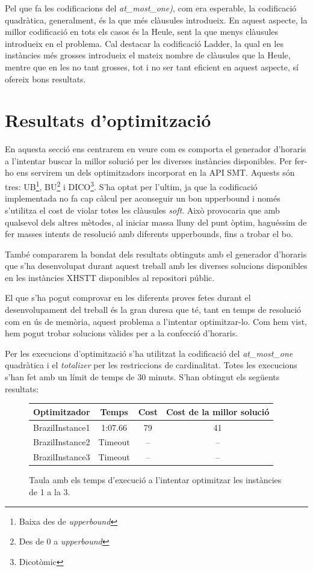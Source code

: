 \documentclass[11pt,a4paper,twoside]{report}
\begin{document}
  Pel que fa les codificacions del \textit{at\_most\_one)}, com era esperable, la codificació quadràtica, generalment, és la que més clàusules introdueix. 
  En aquest aspecte, la millor codificació en tots els casos és la Heule, sent la que menys clàusules introdueix en el problema. Cal destacar la codificació Ladder, 
  la qual en les instàncies més grosses introdueix el mateix nombre de clàusules que la Heule, mentre que en les no tant grosses, tot i no ser tant eficient en aquest aspecte, sí ofereix bons resultats.
  
  \section{Resultats d'optimització}


  En aquesta secció ens centrarem en veure com es comporta el generador d'horaris a l'intentar buscar la millor solució per les diverses instàncies disponibles. Per fer-ho ens servirem un dels optimitzadors incorporat en la API SMT. 
  Aquests són tres: UB\footnote{Baixa des de \textit{upperbound}}, BU\footnote{Des de 0 a \textit{upperbound}} i DICO\footnote{Dicotòmic}.
  S'ha optat per l'ultim, ja que la codificació implementada no fa cap càlcul per aconseguir un bon upperbound i només s'utilitza el cost de violar totes les clàusules \textit{soft}. 
  Això provocaria que amb qualsevol dels altres mètodes, al iniciar massa lluny del punt òptim, haguéssim de fer masses intents de resolució amb diferents upperbounds, fins a trobar el bo. 

  També compararem la bondat dels resultats obtinguts amb el generador d'horaris que s'ha desenvolupat durant aquest treball amb les diverses solucions disponibles en les instàncies XHSTT disponibles al repositori públic. 

  El que s'ha pogut comprovar en les diferents proves fetes durant el desenvolupament del treball és la gran duresa que té, tant en temps de resolució com en ús de memòria, aquest problema a l'intentar optimitzar-lo. 
  Com hem vist, hem pogut trobar solucions vàlides per a la confecció d'horaris.

  Per les execucions d'optimització s'ha utilitzat la codificació del \textit{at\_most\_one} quadràtica i el \textit{totalizer} per les restriccions de cardinalitat. Totes les execucions s'han fet amb un límit de temps de 30 minuts. S'han obtingut els següents resultats:

\begin{figure}[ht!]
    \centering
    \begin{tabular}  { c| c | c | c}
      Optimitzador & Temps & Cost & Cost de la millor solució\\
      \hline
      BrazilInstance1 & 1:07.66 & 79 & 41\\
      BrazilInstance2 & Timeout & -- & --\\
      BrazilInstance3 & Timeout & -- & --\\

      
    \end{tabular}
    \caption{Taula amb els temps d'execució a l'intentar optimitzar les instàncies de 1 a la 3.}
    \label{fig:taula9}
  \end{figure}
\end{document}
